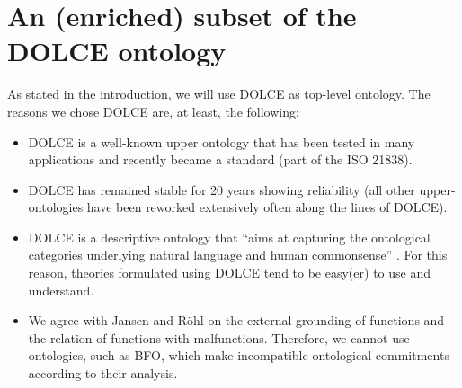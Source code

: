 \documentclass[sw]{iosart2x}
\newcommand{\DOLCE}{\textsc{DOLCE}\xspace} %
\newcommand{\BFO}{\textsc{BFO}\xspace}
\newcommand{\qquotes}[1]{``#1''}
\newcommand{\TODOinline}[1]{{%
}}
\begin{document}

\section{An (enriched) subset of the \DOLCE ontology\label{sec:DOLCE}} 
As stated in the introduction, we will use \DOLCE as top-level ontology. 
The reasons we chose \DOLCE are, at least, the following:
\begin{itemize}
  \item \DOLCE is a well-known upper ontology that has been tested in many applications and recently became a standard (part of the ISO 21838).
  \item \DOLCE has remained stable for 20 years showing reliability (all other upper-ontologies have been reworked extensively often along the lines of \DOLCE).
  \item \DOLCE is a descriptive ontology that \qquotes{aims at capturing the ontological categories underlying natural language and human commonsense} \cite{masoloWonderWebDeliverableD182003}. 
  For this reason, theories formulated using \DOLCE tend to be easy(er) to use and understand.
  \item We agree with Jansen and Röhl \cite{rohlWhyFunctionsAre2014,jansenFunctionsMalfunctioningNegative2018} on the external grounding of functions and the relation of functions with malfunctions. 
  Therefore, we cannot use ontologies, such as \BFO, which make incompatible ontological commitments according to their analysis. 
\end{itemize}
\end{document}
